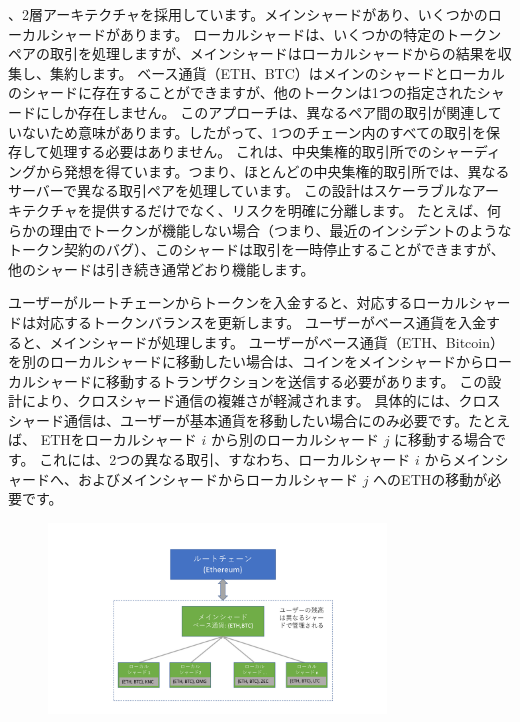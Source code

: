 、2層アーキテクチャを採用しています。メインシャードがあり、いくつかのローカルシャードがあります。 ローカルシャードは、いくつかの特定のトークンペアの取引を処理しますが、メインシャードはローカルシャードからの結果を収集し、集約します。 ベース通貨（ETH、BTC）はメインのシャードとローカルのシャードに存在することができますが、他のトークンは1つの指定されたシャードにしか存在しません。 このアプローチは、異なるペア間の取引が関連していないため意味があります。したがって、1つのチェーン内のすべての取引を保存して処理する必要はありません。 これは、中央集権的取引所でのシャーディングから発想を得ています。つまり、ほとんどの中央集権的取引所では、異なるサーバーで異なる取引ペアを処理しています。 この設計はスケーラブルなアーキテクチャを提供するだけでなく、リスクを明確に分離します。 たとえば、何らかの理由でトークンが機能しない場合（つまり、最近のインシデントのようなトークン契約のバグ）、このシャードは取引を一時停止することができますが、他のシャードは引き続き通常どおり機能します。

ユーザーがルートチェーンからトークンを入金すると、対応するローカルシャードは対応するトークンバランスを更新します。 ユーザーがベース通貨を入金すると、メインシャードが処理します。 ユーザーがベース通貨（ETH、Bitcoin）を別のローカルシャードに移動したい場合は、コインをメインシャードからローカルシャードに移動するトランザクションを送信する必要があります。 この設計により、クロスシャード通信の複雑さが軽減されます。 具体的には、クロスシャード通信は、ユーザーが基本通貨を移動したい場合にのみ必要です。たとえば、 ETHをローカルシャード $i$ から別のローカルシャード $j$ に移動する場合です。 これには、2つの異なる取引、すなわち、ローカルシャード $i$ からメインシャードへ、およびメインシャードからローカルシャード $j$ へのETHの移動が必要です。

\begin{figure}[t]
  \centering
  \includegraphics[width=0.8\textwidth]{images//architecture2}
  \caption{}
  \label{architecture2}
\end{figure}

